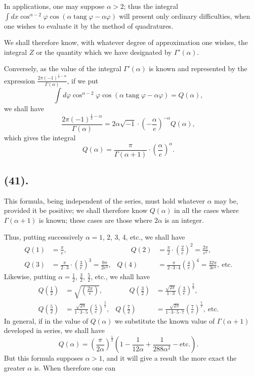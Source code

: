 \documentclass{article}
\begin{document}
In applications, one may suppose $\alpha>2$; thus the integral $\displaystyle\int dx\cos^{\alpha-2}\varphi\cos(\alpha\operatorname{tang}\varphi-\alpha\varphi)$ will present only ordinary difficulties, when one wishes to evaluate it by the method of quadratures.

We shall therefore know, with whatever degree of approximation one wishes, the integral $Z$ or the quantity which we have designated by $\Gamma'(\alpha)$.

Conversely, as the value of the integral $\Gamma'(\alpha)$ is known and represented by the expression $\frac{2\pi(-1)^{\frac{1}{2}-\alpha}}{\Gamma(\alpha)}$, if we put
\[ \int d\varphi\cos^{\alpha-2}\varphi\cos(\alpha\operatorname{tang}\varphi-\alpha\varphi)=Q(\alpha), \]
we shall have
\[ \frac{2\pi(-1)^{\frac{1}{2}-\alpha}}{\Gamma(\alpha)}=2\alpha\sqrt{-1}\cdot\left(-\frac{\alpha}{e}\right)^{-\alpha}Q(\alpha), \]
which gives the integral
\[ Q(\alpha)=\frac{\pi}{\Gamma(\alpha+1)}\cdot\left(\frac{\alpha}{e}\right)^{\alpha}. \tag{2} \]

\subsection*{(41).}

This formula, being independent of the series, must hold whatever $\alpha$ may be, provided it be positive; we shall therefore know $Q(\alpha)$ in all the cases where $\Gamma(\alpha+1)$ is known; these cases are those where $2\alpha$ is an integer.

Thus, putting successively $\alpha=1$, 2, 3, 4, etc., we shall have
\[ \begin{aligned} Q(1)&=\frac{\pi}{e}, &\qquad Q(2)&=\frac{\pi}{2}\cdot\left(\frac{2}{e}\right)^{2}=\frac{2\pi}{e^{2}},\\ Q(3)&=\frac{\pi}{2\cdot3}\cdot\left(\frac{3}{e}\right)^{3}=\frac{9\pi}{2e^{3}}, & Q(4)&=\frac{\pi}{2\cdot3\cdot4}\left(\frac{4}{e}\right)^{4}=\frac{32\pi}{3e^{4}},\ \text{etc.} \end{aligned} \]
Likewise, putting $\alpha=\frac{1}{2}$, $\frac{3}{2}$, $\frac{5}{2}$, etc., we shall have
\[ \begin{aligned} Q\left(\frac{1}{2}\right)&=\sqrt{\left(\frac{2\pi}{e}\right)}, &\qquad Q\left(\frac{3}{2}\right)&=\frac{\sqrt{2\pi}}{1\cdot3}\left(\frac{3}{e}\right)^{\frac{3}{2}},\\ Q\left(\frac{5}{2}\right)&=\frac{\sqrt{2\pi}}{1\cdot3\cdot5}\left(\frac{5}{e}\right)^{\frac{5}{2}}, & Q\left(\frac{7}{2}\right)&=\frac{\sqrt{2\pi}}{1\cdot3\cdot5\cdot7}\left(\frac{7}{e}\right)^{\frac{7}{2}},\ \text{etc.} \end{aligned} \]
In general, if in the value of $Q(\alpha)$ we substitute the known value of $\Gamma(\alpha+1)$ developed in series, we shall have
\[ Q(\alpha)=\left(\frac{\pi}{2\alpha}\right)^{\frac{1}{2}}\left(1-\frac{1}{12\alpha}+\frac{1}{288\alpha^{2}}-\text{etc.}\right). \tag{3} \]
But this formula supposes $\alpha>1$, and it will give a result the more exact the greater $\alpha$ is. When therefore one can
\end{document}
